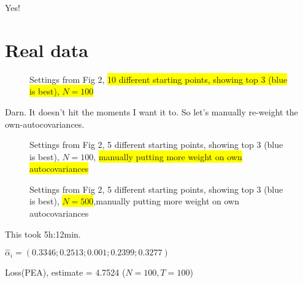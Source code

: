 \documentclass[11pt]{article}
\def \myFigPath {../../figures/}
\renewcommand{\[}{\begin{equation}}
\renewcommand{\]}{\end{equation}}
\begin{document}
Yes!

\clearpage
\section{Real data}

\begin{figure}[h!]
\caption{Settings from Fig 2,  \colorbox{yellow}{10 different starting points, showing top 3 (blue is best), $N=100$}}
\end{figure}

Darn. It doesn't hit the moments I want it to. So let's manually re-weight the own-autocovariances.


\clearpage
\begin{figure}[h!]
\caption{Settings from Fig 2,  5 different starting points, showing top 3 (blue is best), $N=100$, \colorbox{yellow}{manually putting more weight on own autocovariances}}
\end{figure}

\clearpage
\begin{figure}[h!]
\caption{Settings from Fig 2,  5 different starting points, showing top 3 (blue is best),  \colorbox{yellow}{$N=500$},manually putting more weight on own autocovariances}
\end{figure}

This took 5h:12min.

$\hat{\alpha}_i = (0.3346;    0.2513;    0.001;    0.2399;    0.3277)$

Loss(PEA), estimate = 4.7524 ($N=100, T=100$)
\end{document}
